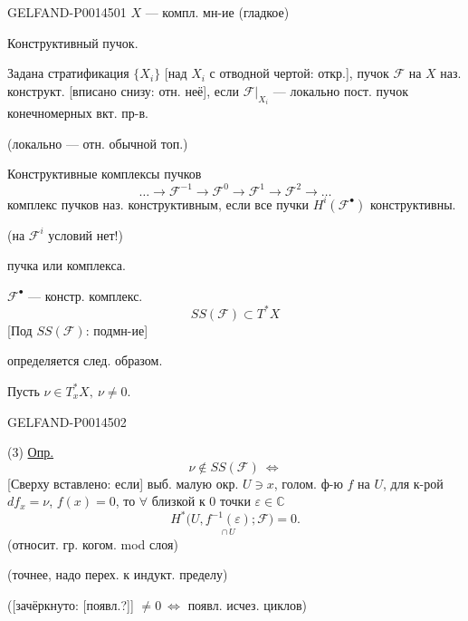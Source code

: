 \begin{GelfandAdjacentEvidence}{GELFAND-P001450}{1}
\(X\) — компл. мн-ие (гладкое)

Конструктивный пучок.

Задана стратификация \(\{X_i\}\) [над \(X_i\) с отводной чертой: откр.],
пучок \(\mathcal F\) на \(X\) наз. конструкт.
[вписано снизу: отн. неё],
если \(\mathcal{F}|_{X_i}\) — локально пост. пучок конечномерных вкт. пр-в.

(локально — отн. обычной топ.)

Конструктивные комплексы пучков
\begin{equation*}
\ldots\longrightarrow\mathcal{F}^{-1}
\longrightarrow\mathcal{F}^{0}
\longrightarrow\mathcal{F}^{1}
\longrightarrow\mathcal{F}^{2}\longrightarrow\ldots \tag{1}
\end{equation*}
комплекс пучков наз. конструктивным, если все пучки \(H^{i}(\mathcal{F}^{\bullet})\) конструктивны.

(на \(\mathcal{F}^{i}\) условий нет!)

 пучка или комплекса.

\(\mathcal{F}^{\bullet}\) — констр. комплекс.
\begin{equation*}
SS(\mathcal F)\subset T^*X \tag{2}
\end{equation*}
[Под \(SS(\mathcal F)\): подмн-ие]

определяется след. образом.

Пусть \(\nu\in T_x^{*}X,\ \nu\ne0\).
\end{GelfandAdjacentEvidence}
\begin{GelfandAdjacentEvidence}{GELFAND-P001450}{2}


(3) \uline{Опр.}
\[
\nu\notin SS(\mathcal{F})\ \Longleftrightarrow
\]
[Сверху вставлено: если] выб. малую окр. \(U\ni x\), голом. ф-ю \(f\) на \(U\),
для к-рой \(df_x=\nu\), \(f(x)=0\), то \(\forall\) близкой к \(0\) точки \(\varepsilon\in\mathbb C\)
\begin{equation*}
H^{*}\bigl(U,\underset{\cap\,U}{f^{-1}(\varepsilon)};\mathcal{F}\bigr)=0. \tag{4}
\end{equation*}
(относит. гр. когом. mod слоя)

(точнее, надо перех. к индукт. пределу)

([зачёркнуто: [появл.?]] \(\ne0\ \Longleftrightarrow\) появл. исчез. циклов)
\end{GelfandAdjacentEvidence}


